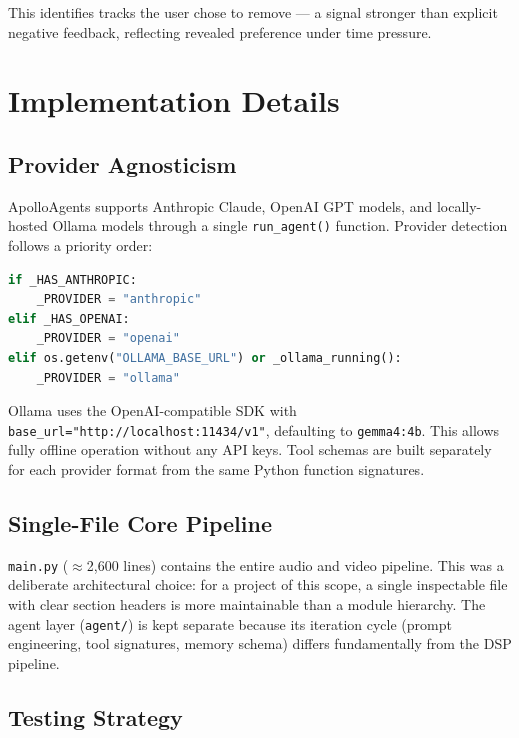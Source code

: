 \documentclass[11pt,a4paper]{article}
\begin{document}
This identifies tracks the user chose to remove --- a signal stronger than
explicit negative feedback, reflecting revealed preference under time pressure.

\section{Implementation Details}

\subsection{Provider Agnosticism}

ApolloAgents supports Anthropic Claude, OpenAI GPT models, and locally-hosted
Ollama models through a single \texttt{run\_agent()} function. Provider
detection follows a priority order:

\begin{lstlisting}[language=Python]
if _HAS_ANTHROPIC:
    _PROVIDER = "anthropic"
elif _HAS_OPENAI:
    _PROVIDER = "openai"
elif os.getenv("OLLAMA_BASE_URL") or _ollama_running():
    _PROVIDER = "ollama"
\end{lstlisting}

Ollama uses the OpenAI-compatible SDK with
\texttt{base\_url="http://localhost:11434/v1"}, defaulting to
\texttt{gemma4:4b}. This allows fully offline operation without any API
keys. Tool schemas are built separately for each provider format from the
same Python function signatures.

\subsection{Single-File Core Pipeline}

\texttt{main.py} ($\approx$2,600 lines) contains the entire audio and video
pipeline. This was a deliberate architectural choice: for a project of this
scope, a single inspectable file with clear section headers is more
maintainable than a module hierarchy. The agent layer (\texttt{agent/}) is
kept separate because its iteration cycle (prompt engineering, tool
signatures, memory schema) differs fundamentally from the DSP pipeline.

\subsection{Testing Strategy}
\end{document}

